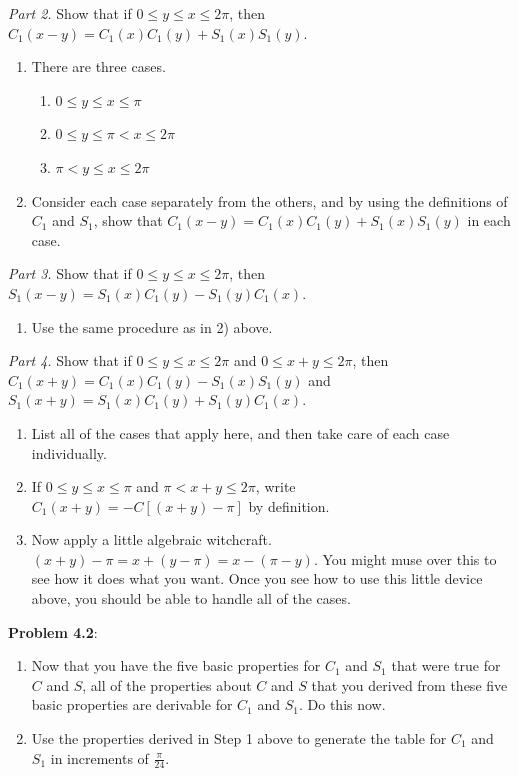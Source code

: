 \documentclass[english]{book}
\begin{document}
\emph{Part 2.} Show that if $0 \leq y \leq x \leq 2\pi$, then $C_{1}(x-y) = C_{1}(x) C_{1}(y) + S_{1}(x) S_{1}(y)$.
\begin{enumerate}[\hspace{1cm}1)]
  \item There are three cases.
    \begin{enumerate}[\hspace{1cm}a)]
      \item $0 \leq y \leq x \leq \pi$
      \item $0 \leq y \leq \pi < x \leq 2 \pi$
      \item $\pi < y \leq x \leq 2 \pi$
    \end{enumerate}
  \item Consider each case separately from the others, and by using the definitions of $C_{1}$ and $S_{1}$, show that $C_{1}(x-y) = C_{1}(x) C_{1}(y) + S_{1}(x) S_{1}(y)$ in each case.
\end{enumerate}

\emph{Part 3.} Show that if $0 \leq y \leq x \leq 2\pi$, then $S_{1}(x-y) = S_{1}(x) C_{1}(y) - S_{1}(y) C_{1}(x)$.
\begin{enumerate}[\hspace{1cm}1)]
  \item Use the same procedure as in 2) above.
\end{enumerate}

\emph{Part 4.} Show that if $0 \leq y \leq x \leq 2\pi$ and $0 \leq x+y \leq 2\pi$, then $C_{1}(x+y) = C_{1}(x) C_{1}(y) - S_{1}(x) S_{1}(y)$ and $S_{1}(x+y) = S_{1}(x) C_{1}(y) +
S_{1}(y) C_{1}(x)$.
\begin{enumerate}[\hspace{1cm}1)]
  \item List all of the cases that apply here, and then take care of each case individually.
  \item If $0 \leq y \leq x \leq \pi$ and $\pi < x+y \leq 2\pi$, write $C_{1}(x+y) = -C[(x+y) - \pi]$ by definition.
  \item Now apply a little algebraic witchcraft. $(x+y) - \pi = x + (y-\pi) = x - (\pi-y)$. You might muse over this to see how it does what you want. Once you see how to use this little device above, you should be able to handle all of the cases.
\end{enumerate}

\textbf{Problem 4.2}:
\begin{enumerate}[\hspace{1cm}1)]
  \item Now that you have the five basic properties for $C_{1}$ and $S_{1}$ that were true for $C$ and $S$, all of the properties about $C$ and $S$ that you derived from these five basic properties are derivable for $C_{1}$ and $S_{1}$. Do this now.
  \item Use the properties derived in Step 1 above to generate the table for $C_{1}$ and $S_{1}$ in increments of $\frac{\pi}{24}$.
\end{enumerate}
\end{document}
